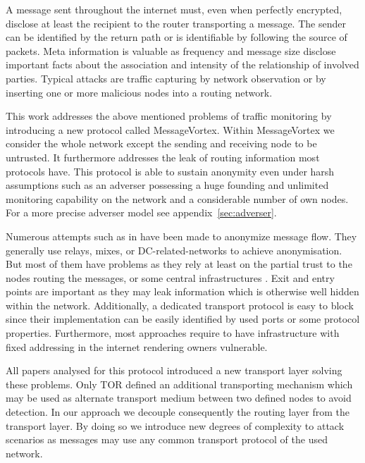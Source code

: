 \documentclass[9pt,journal,compsoc]{IEEEtran}
\begin{document}
A message sent throughout the internet must, even when perfectly encrypted, disclose at least the recipient to the router transporting a message. The sender can be identified by the return path or is identifiable by following the source of packets. Meta information is valuable as frequency and message size disclose important facts about the association and intensity of the relationship of involved parties. Typical attacks are traffic capturing by network observation or by inserting one or more malicious nodes into a routing network. 

This work addresses the above mentioned problems of traffic monitoring by introducing a new  protocol called MessageVortex. Within MessageVortex we consider the whole network except the sending and receiving node to be untrusted. It furthermore addresses the leak of routing information most protocols have. This protocol is able to sustain anonymity even under harsh assumptions such as an adverser possessing a huge founding and unlimited monitoring capability on the network and a considerable number of own nodes. For a more precise adverser model see appendix~\ref{sec:adverser}.

Numerous attempts such as in \cite{minion-design,babel,mixmaster-spec,tor-design,freehaven-berk,herbivore:tr} have been made to anonymize message flow. They generally use relays\cite{CHAUM1}, mixes\cite{CHAUM1}, or DC-related-networks\cite{chaum-dc} to achieve anonymisation. But most of them have problems as they rely at least on the partial trust to the nodes routing the messages, or some central infrastructures \cite{hs-attack06,esorics13-cellflood,esorics12-torscan,oakland2013-trawling}. Exit and entry points are important as they may leak information which is otherwise well hidden within the network. Additionally, a dedicated transport protocol is easy to block since their implementation can be easily identified by used ports or some protocol properties. Furthermore, most approaches require to have infrastructure with fixed addressing in the internet rendering owners vulnerable.

All papers analysed for this protocol introduced a new transport layer solving these problems. Only TOR defined an additional transporting mechanism which may be used as alternate transport medium between two defined nodes to avoid detection. In our approach we decouple consequently the routing layer from the transport layer. By doing so we introduce new degrees of complexity to attack scenarios as messages may use any common transport protocol of the used network. 
\end{document}
